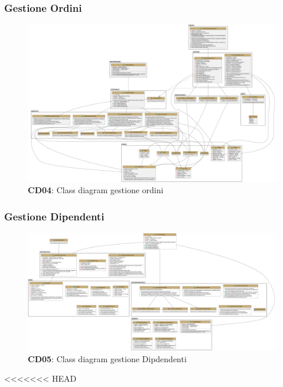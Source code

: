     \subsubsection{Gestione Ordini}
        \begin{figure}[H]
            \centering
            \includegraphics[scale=0.15]{assets/diagrammi/Class diagram di design/Class Diagramm Design Gestione Ordini.png}
            \caption*{\textbf{CD04}: Class diagram gestione ordini}\label{fig:ClassDiagram_ManageOrders}
        \end{figure}

    \subsubsection{Gestione Dipendenti}
        \begin{figure}[H]
            \centering
            \includegraphics[scale=0.15]{assets/diagrammi/Class diagram di design/gestione dipendenti.png}
            \caption*{\textbf{CD05}: Class diagram gestione Dipdendenti}\label{fig:ClassDiagram_ManageWorkers}
        \end{figure}
<<<<<<< HEAD
    
